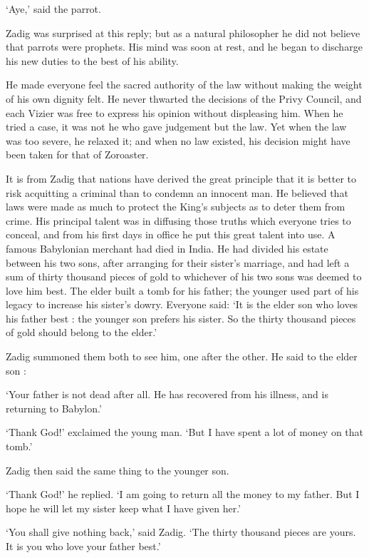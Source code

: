 \documentclass{article}
\begin{document}
\begin{center}
`Aye,' said the parrot. 

Zadig was surprised at this reply; but as a natural philosopher he did not believe 
that parrots were prophets. His mind was soon at rest, and he began to discharge 
his new duties to the best of his ability. 

He made everyone feel the sacred authority of the law without making the weight 
of his own dignity felt. He never thwarted the decisions of the Privy Council, 
and each Vizier was free to express his opinion without displeasing him. When he 
tried a case, it was not he who gave judgement but the law. Yet when the law was 
too severe, he relaxed it; and when no law existed, his decision might have been 
taken for that of Zoroaster. 

It is from Zadig that nations have derived the great principle that it is better 
to risk acquitting a criminal than to condemn an innocent man. He believed that 
laws were made as much to protect the King's subjects as to deter them from crime. 
His principal talent was in diffusing those truths which everyone tries to conceal, 
and from his first days in office he put this great talent into use. A famous Babylonian 
merchant had died in India. He had divided his estate between his two sons, after 
arranging for their sister's marriage, and had left a sum of thirty thousand pieces 
of gold to whichever of his two sons was deemed to love him best. The elder built 
a tomb for his father; the younger used part of his legacy to increase his sister's 
dowry. Everyone said: `It is the elder son who loves his father best : the younger 
son prefers his sister. So the thirty thousand pieces of gold should belong to 
the elder.' 

Zadig summoned them both to see him, one after the other. He said to the elder 
son : 

`Your father is not dead after all. He has recovered from his illness, and is returning 
to Babylon.' 

`Thank God!' exclaimed the young man. `But I have spent a lot of money on that 
tomb.' 

Zadig then said the same thing to the younger son. 

`Thank God!' he replied. `I am going to return all the money to my father. But 
I hope he will let my sister keep what I have given her.' 

`You shall give nothing back,' said Zadig. `The thirty thousand pieces are yours. 
It is you who love your father best.' 


\end{center}
\end{document}
